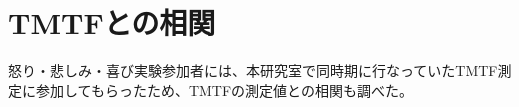 \section{TMTFとの相関}
怒り・悲しみ・喜び実験参加者には、本研究室で同時期に行なっていたTMTF測定に参加してもらったため、TMTFの測定値との相関も調べた。







































